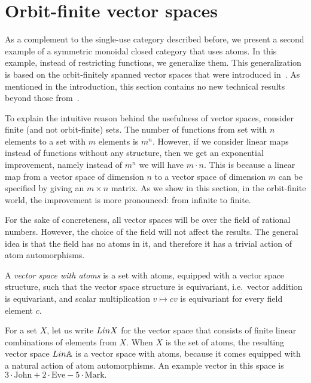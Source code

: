 \section{Orbit-finite vector spaces}
As a complement to the single-use category described before, we present a second example of a symmetric monoidal closed category that  uses atoms. In this example, instead of restricting functions, we generalize them. This generalization is based on the  orbit-finitely spanned vector spaces that were introduced in~\cite{bojanczykKM21OrbitFiniteVector}. As mentioned in the introduction,  this section contains no new technical results beyond those from~\cite{bojanczykKM21OrbitFiniteVector}. 

To explain the intuitive reason behind the usefulness of vector spaces, consider finite (and not orbit-finite) sets. The number of functions from set with $n$ elements to a set with $m$ elements is $m^n$. However, if we consider linear maps instead of functions without any structure, then we get an exponential improvement, namely instead of $m^n$ we will have $m \cdot n$. 
This is because a linear map from a vector space of dimension $n$ to a vector space of dimension $m$ can be specified by giving an $m \times n$ matrix. As we show in this section,  in the orbit-finite world, the improvement is more pronounced: from infinite to finite.

For the sake of concreteness, all  vector spaces will be over the field of rational numbers. However, the choice of the field will not affect the results. The general idea is that the field has no atoms in it, and therefore it has a trivial action of atom automorphisms. 
\begin{definition}
    A \emph{vector space with atoms} is a set with atoms, equipped with a vector space structure, such that the vector space structure is equivariant, i.e.~vector addition is equivariant, and  scalar multiplication $v \mapsto cv$ is equivariant for every field element $c$.
\end{definition}


\begin{example} \label{ex:lina} For a set $X$, let us write $\Lin X$ for the vector space that consists of finite linear combinations of elements from $X$. When $X$ is the set of atoms, the resulting vector space $\Lin \atoms$ is a vector space with atoms, because it comes equipped with a natural action of atom automorphisms.  An example vector in this space is $
3 \cdot \text{John} + 2 \cdot \text{Eve} - 5 \cdot \text{Mark}.
$ \exampleend
\end{example}

